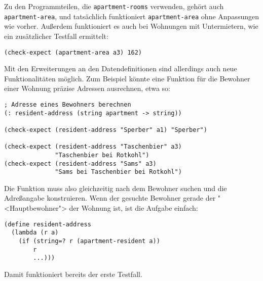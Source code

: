 Zu den Programmteilen, die \texttt{apartment-rooms} verwenden,
gehört auch \texttt{apartment-area}, und tatsächlich funktioniert
\texttt{apartment-area} ohne Anpassungen wie vorher.  Außerdem
funktioniert es auch bei Wohnungen mit Untermietern, wie ein
zusätzlicher Testfall ermittelt:
%
\begin{verbatim}
(check-expect (apartment-area a3) 162)
\end{verbatim}
%
Mit den Erweiterungen an den Datendefinitionen sind allerdings auch
neue Funktionalitäten möglich.  Zum Beispiel könnte eine Funktion für
die Bewohner einer Wohnung präzise Adressen ausrechnen, etwa so:
%
\begin{verbatim}
; Adresse eines Bewohners berechnen
(: resident-address (string apartment -> string))

(check-expect (resident-address "Sperber" a1) "Sperber")

(check-expect (resident-address "Taschenbier" a3)
              "Taschenbier bei Rotkohl") 
(check-expect (resident-address "Sams" a3)
              "Sams bei Taschenbier bei Rotkohl")
\end{verbatim}
%
Die Funktion muss also gleichzeitig nach dem Bewohner suchen und die
Adreßangabe konstruieren.  Wenn der gesuchte Bewohner gerade der
"<Hauptbewohner"> der Wohnung ist, ist die Aufgabe einfach:
%
\begin{verbatim}
(define resident-address
  (lambda (r a)
    (if (string=? r (apartment-resident a))
        r
        ...)))
\end{verbatim}
%
Damit funktioniert bereits der erste Testfall. 

